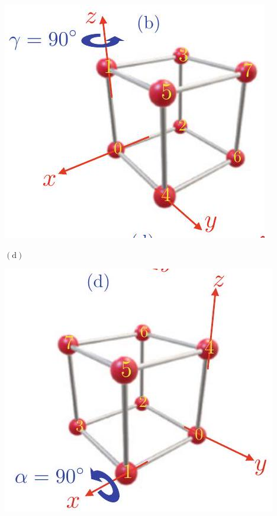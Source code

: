 \documentclass[10pt]{article}
\begin{document}
\begin{center}
\includegraphics[max width=\textwidth]{2023_04_20_41f1ceac5a31dc7d1b59g-120}
\end{center}

$(\mathrm{d})$

\begin{center}
\includegraphics[max width=\textwidth]{2023_04_20_41f1ceac5a31dc7d1b59g-120(1)}
\end{center}
\end{document}
